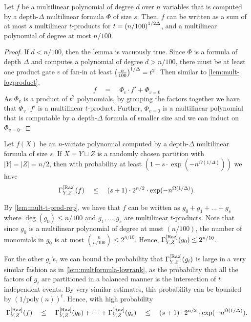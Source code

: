 \begin{lemma}\label{lem:mult-t-prod-rep}
Let $f$ be a multilinear polynomial of degree $d$ over $n$ variables that is computed by a depth-$\Delta$ multilinear formula $\Phi$ of size $s$. 
Then, $f$ can be written as a sum of at most $s$ multilinear $t$-products for $t = \left(n/100\right)^{1/2\Delta}$, and a multilinear polynomial of degree at most $n/100$.  
\end{lemma}
\begin{proof}
If $d < n/100$, then the lemma is vacuously true. 
Since $\Phi$ is a formula of depth $\Delta$ and computes a polynomial of degree $d > n/100$, there must be at least one product gate $v$ of fan-in at least $\left(\frac{n}{100}\right)^{1/\Delta} = t^2$. 
Then similar to \autoref{lem:mult-logproduct}, 
$$
f \quad=\quad \Phi_v \cdot f'  + \Phi_{v=0}
$$
As $\Phi_v$ is a product of $t^2$ polynomials, by grouping the factors together we have that $\Phi_v \cdot f'$ is a multilinear $t$-product. 
Further, $\Phi_{v=0}$ is a multilinear polynomial that is computable by a depth-$\Delta$ formula of smaller size and we can induct on $\Phi_{v=0}$. 
\end{proof}

\begin{lemma}\label{lem:mult-const-depth-upper-bound}
Let $f(X)$ be an $n$-variate polynomial computed by a depth-$\Delta$ multilinear formula of size $s$. 
If $X = Y \sqcup Z$ is a randomly chosen partition with $|Y| = |Z| = n/2$, then with probability at least $(1 - s \cdot \exp({-n^{\Omega(1/\Delta)}}))$ we have
$$
\Gamma^{\mathrm{[Raz]}}_{Y,Z}(f) \quad\leq\quad (s+1) \cdot 2^{n/2} \cdot \exp(-n^{\Omega(1/\Delta)}).
$$
\end{lemma}
\begin{proof-sketch}
By \autoref{lem:mult-t-prod-rep}, we have that $f$ can be written as $g_0 + g_1 + \dots + g_s$ where $\deg(g_0) \leq n/100$ and $g_1,\dots, g_s$ are multilinear $t$-products. 
Note that since $g_0$ is a multilinear polynomial of degree at most $(n/100)$, the number of monomials in $g_0$ is at most $\binom{n}{n/100} \leq 2^{n/10}$. 
Hence, $\Gamma^{\mathrm{[Raz]}}_{Y,Z}(g_0) \leq 2^{n/10}$. 

For the other $g_i$'s, we can bound the probability that $\Gamma^{\mathrm{[Raz]}}_{Y,Z}(g_i)$ is large in a very similar fashion as in \autoref{lem:multformula-lowrank}, as the probability that all the factors of $g_i$ are partitioned in a balanced manner is the intersection of $t$ independent events. 
By very similar estimates, this probability can be bounded by $(1/\mathrm{poly}(n))^t$. 
Hence, with high probability 
$$
\Gamma^{\mathrm{[Raz]}}_{Y,Z}(f) \quad \leq \quad \Gamma^{\mathrm{[Raz]}}_{Y,Z}(g_0) + \dots + \Gamma^{\mathrm{[Raz]}}_{Y,Z}(g_s) \quad \leq \quad (s+1)\cdot 2^{n/2} \cdot \exp(-n^{\Omega(1/\Delta)}).
$$
\end{proof-sketch}

